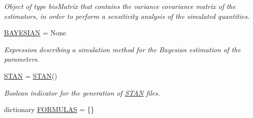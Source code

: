 \begin{DoxyCompactItemize}
\begin{DoxyCompactList}\small\item\em Object of type bio\+Matrix that contains the variance covariance matrix of the estimators, in order to perform a sensitivity analysis of the simulated quantities. \end{DoxyCompactList}\item 
\hyperlink{classbiogeme_1_1_b_i_o_g_e_m_e___o_b_j_e_c_t_accb5e1ba6dbea4d40a8eef3f33ac2c8e}{B\+A\+Y\+E\+S\+I\+AN} = None
\begin{DoxyCompactList}\small\item\em Expression describing a simulation method for the Bayesian estimation of the parameters. \end{DoxyCompactList}\item 
\hyperlink{classbiogeme_1_1_b_i_o_g_e_m_e___o_b_j_e_c_t_a678800a5faa9498ac9a7e710c2c8bf4e}{S\+T\+AN} = \hyperlink{classbiogeme_1_1_s_t_a_n}{S\+T\+AN}()\hypertarget{classbiogeme_1_1_b_i_o_g_e_m_e___o_b_j_e_c_t_a678800a5faa9498ac9a7e710c2c8bf4e}{}\label{classbiogeme_1_1_b_i_o_g_e_m_e___o_b_j_e_c_t_a678800a5faa9498ac9a7e710c2c8bf4e}

\begin{DoxyCompactList}\small\item\em Boolean indicator for the generation of \hyperlink{classbiogeme_1_1_s_t_a_n}{S\+T\+AN} files. \end{DoxyCompactList}\item 
dictionary \hyperlink{classbiogeme_1_1_b_i_o_g_e_m_e___o_b_j_e_c_t_a11df22c3f1edaf5023aa6d28bf4eeb56}{F\+O\+R\+M\+U\+L\+AS} = \{\}\hypertarget{classbiogeme_1_1_b_i_o_g_e_m_e___o_b_j_e_c_t_a11df22c3f1edaf5023aa6d28bf4eeb56}{}\label{classbiogeme_1_1_b_i_o_g_e_m_e___o_b_j_e_c_t_a11df22c3f1edaf5023aa6d28bf4eeb56}


\end{DoxyCompactItemize}

